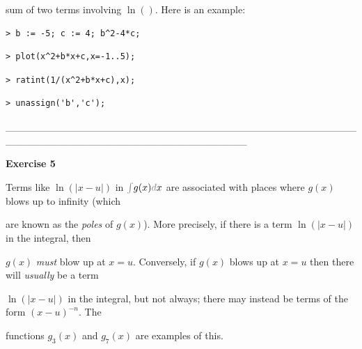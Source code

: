 \documentclass{article}
\begin{document}
\begin{Maple Normal}
sum of two terms involving 
$\ln ()$.  Here is an example:
\end{Maple Normal}
\begin{lstlisting}
> b := -5; c := 4; b^2-4*c;
\end{lstlisting}
\begin{lstlisting}
> plot(x^2+b*x+c,x=-1..5);

\end{lstlisting}
\begin{lstlisting}
> ratint(1/(x^2+b*x+c),x);
\end{lstlisting}
\begin{lstlisting}
> unassign('b','c');
\end{lstlisting}
\begin{Maple Normal}
\_\_\_\_\_\_\_\_\_\_\_\_\_\_\_\_\_\_\_\_\_\_\_\_\_\_\_\_\_\_\_\_\_\_\_\_\_\_\_\_\_\_\_\_\_\_\_\_\_\_\_\_\_\_\_\_\_\_\_\_\_\_\_\_\_\_\_\_\_\_\_\_\_\_\_\_\_\_\_\_\_
\end{Maple Normal}
\begin{Maple Heading 2}
\textbf{Exercise 5}
\end{Maple Heading 2}
\begin{Maple Normal}
Terms like 
$\ln ({| x -u |})$ in 
$\textcolor{gray}{\int}g (x)\textcolor{gray}{d}x$ are associated with places where 
$g (x)$ blows up to infinity (which
\end{Maple Normal}
\begin{Maple Normal}
are known as the \textit{poles }of 
$g (x)$).  More precisely, if there is a term 
$\ln ({| x -u |})$ in the integral, then
\end{Maple Normal}
\begin{Maple Normal}

$g (x)$ \textit{must }blow up at 
$x =u$.  Conversely, if 
$g (x)$ blows up at 
$x =u$ then there will \textit{usually} be a term
\end{Maple Normal}
\begin{Maple Normal}

$\ln ({| x -u |})$ in the integral, but not always; there may instead be terms of the form 
$(x -u)^{-n}$.  The
\end{Maple Normal}
\begin{Maple Normal}
functions 
$g_{3}(x)$ and 
$g_{7}(x)$ are examples of this.
\end{Maple Normal}
\begin{Maple Normal}
  
\end{Maple Normal}
\end{document}
